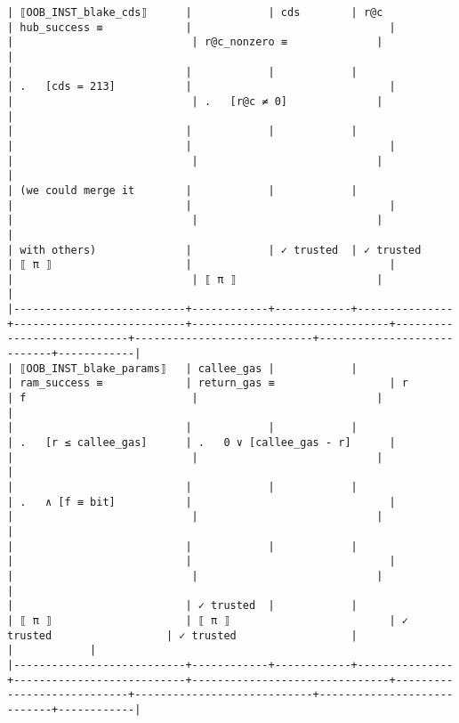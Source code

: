 \documentclass[varwidth=\maxdimen,margin=0.5cm,multi={verbatim}]{standalone}
\begin{document}
\begin{verbatim}
| ⟦OOB_INST_blake_cds⟧      |            | cds        | r@c           | hub_success ≡             |                               |                            |                            | r@c_nonzero ≡              |            |
|                           |            |            |               | .   [cds = 213]           |                               |                            |                            | .   [r@c ≠ 0]              |            |
|                           |            |            |               |                           |                               |                            |                            |                            |            |
| (we could merge it        |            |            |               |                           |                               |                            |                            |                            |            |
| with others)              |            | ✓ trusted  | ✓ trusted     | ⟦ π ⟧                     |                               |                            |                            | ⟦ π ⟧                      |            |
|---------------------------+------------+------------+---------------+---------------------------+-------------------------------+----------------------------+----------------------------+----------------------------+------------|
| ⟦OOB_INST_blake_params⟧   | callee_gas |            |               | ram_success ≡             | return_gas ≡                  | r                          | f                          |                            |            |
|                           |            |            |               | .   [r ≤ callee_gas]      | .   0 ∨ [callee_gas - r]      |                            |                            |                            |            |
|                           |            |            |               | .   ∧ [f ≡ bit]           |                               |                            |                            |                            |            |
|                           |            |            |               |                           |                               |                            |                            |                            |            |
|                           | ✓ trusted  |            |               | ⟦ π ⟧                     | ⟦ π ⟧                         | ✓ trusted                  | ✓ trusted                  |                            |            |
|---------------------------+------------+------------+---------------+---------------------------+-------------------------------+----------------------------+----------------------------+----------------------------+------------|


\end{verbatim}
\end{document}
